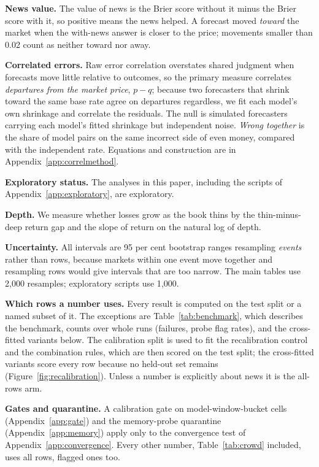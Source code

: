 \textbf{News value.} The value of news is the Brier score without it minus the
Brier score with it, so positive means the news helped. A forecast moved
\emph{toward} the market when the with-news answer is closer to the price;
movements smaller than 0.02 count as neither toward nor away.

\textbf{Correlated errors.} Raw error correlation overstates shared judgment when
forecasts move little relative to outcomes, so the primary measure correlates
\emph{departures from the market price}, $p-q$; because two forecasters that
shrink toward the same base rate agree on departures regardless, we fit each
model's own shrinkage and correlate the residuals. The null is simulated
forecasters carrying each model's fitted shrinkage but independent noise.
\emph{Wrong together} is the share of model pairs on the same incorrect side of
even money, compared with the independent rate. Equations and construction
are in Appendix~\ref{app:correlmethod}.

\textbf{Exploratory status.} The analyses in this paper, including the scripts
of Appendix~\ref{app:exploratory}, are exploratory.

\textbf{Depth.} We measure whether losses grow as the book thins by the
thin-minus-deep return gap and the slope of return on the natural log of depth.

\textbf{Uncertainty.} All intervals are 95 per cent bootstrap ranges resampling
\emph{events} rather than rows, because markets within one event move together
and resampling rows would give intervals that are too narrow. The main tables use
2{,}000 resamples; exploratory scripts use 1{,}000.

\textbf{Which rows a number uses.} Every result is computed on the test split
or a named subset of it. The exceptions are Table~\ref{tab:benchmark}, which
describes the benchmark, counts over whole runs (failures, probe flag rates), and
the cross-fitted variants below. The calibration split is used to fit the recalibration
control and the combination rules, which are then scored on the test split; the
cross-fitted variants score every row because no held-out set
remains (Figure~\ref{fig:recalibration}). Unless a number is explicitly about
news it is the all-rows arm.

\textbf{Gates and quarantine.} A calibration gate on model-window-bucket cells
(Appendix~\ref{app:gate}) and the memory-probe quarantine
(Appendix~\ref{app:memory}) apply only to the convergence test of
Appendix~\ref{app:convergence}. Every other number, Table~\ref{tab:crowd}
included, uses all rows, flagged ones too.
